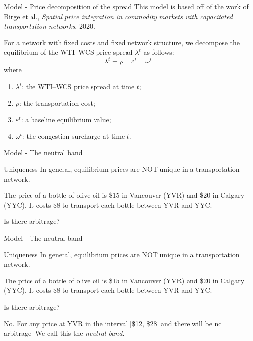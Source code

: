 \documentclass[aspectratio = 169]{beamer}
\begin{document}
\begin{frame}{Model - Price decomposition of the spread}
This model is based off of the work of Birge et al., \emph{Spatial price integration in commodity markets with capacitated transportation networks}, 2020.
\vspace{0.5cm}

For a network with fixed costs and fixed network structure, we decompose the equilibrium of the WTI--WCS price spread $\lambda^{t}$ as follows:
    \[\lambda^{t} = \rho + \varepsilon^{t} + \omega^{t}\]
where
\begin{enumerate}
    \item $\lambda^{t}$: the WTI--WCS price spread at time $t$;
    \item $\rho$: the transportation cost;
    \item $\varepsilon^{t}$: a baseline equilibrium value;
    \item $\omega^{t}$: the congestion surcharge at time $t$.
\end{enumerate}
\end{frame}

\begin{frame}{Model - The neutral band}
\begin{alertblock}{Uniqueness}
{In general, equilibrium prices are NOT unique in a transportation network.}\end{alertblock}
\begin{example}
The price of a bottle of olive oil is \$15 in Vancouver (YVR) and \$20 in Calgary (YYC). It costs \$8 to transport each bottle between YVR and YYC.
\end{example}
Is there arbitrage? 
\end{frame}

\begin{frame}{Model - The neutral band}
\begin{alertblock}{Uniqueness}
{In general, equilibrium prices are NOT unique in a transportation network.}\end{alertblock}
\begin{example}
The price of a bottle of olive oil is \$15 in Vancouver (YVR) and \$20 in Calgary (YYC). It costs \$8 to transport each bottle between YVR and YYC.
\end{example}
Is there arbitrage?

No. For any price at YVR in the interval [\$12, \$28] and there will be no arbitrage. We call this the \emph{neutral band}.
\end{frame}
\end{document}
